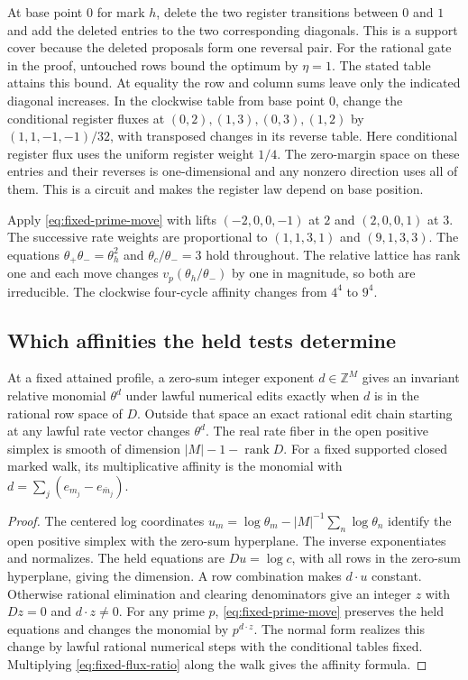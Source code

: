 At base point \(0\) for mark \(h\), delete the two register
transitions between \(0\) and \(1\) and add the deleted entries to
the two corresponding diagonals. This is a support cover because
the deleted proposals form one reversal pair. For the rational
gate in the proof, untouched rows bound the optimum by \(\eta=1\).
The stated table attains this bound. At equality the row and
column sums leave only the indicated diagonal increases. In the
clockwise table from base point \(0\), change the conditional register fluxes at
\((0,2),(1,3),(0,3),(1,2)\) by
\((1,1,-1,-1)/32\), with transposed changes in its reverse table.
Here conditional register flux uses the uniform register weight
\(1/4\). The zero-margin space on these entries and their reverses
is one-dimensional and any nonzero direction uses all of them.
This is a circuit and makes the register law depend on base position.

Apply \eqref{eq:fixed-prime-move} with lifts \((-2,0,0,-1)\) at
\(2\) and \((2,0,0,1)\) at \(3\). The successive rate weights are
proportional to \((1,1,3,1)\) and \((9,1,3,3)\). The equations
\(\theta_+\theta_-=\theta_h^2\) and \(\theta_c/\theta_-=3\) hold
throughout. The relative lattice has rank one and each move
changes \(v_p(\theta_h/\theta_-)\) by one in magnitude, so both are
irreducible. The clockwise four-cycle affinity changes from \(4^4\)
to \(9^4\).

\subsection{Which affinities the held tests determine}

\begin{theorem}\label{thm:fixed-affinity}
At a fixed attained profile, a zero-sum integer exponent
\(d\in\mathbb Z^M\) gives an invariant relative monomial
\(\theta^d\) under lawful numerical edits exactly when \(d\) is in
the rational row space of \(D\). Outside that space an exact rational
edit chain starting at any lawful rate vector changes \(\theta^d\).
The real rate fiber in the open positive simplex is smooth of
dimension \(|M|-1-\operatorname{rank}D\). For a fixed supported
closed marked walk, its multiplicative affinity is the monomial
with \(d=\sum_j(e_{m_j}-e_{\bar m_j})\).
\end{theorem}

\begin{proof}
The centered log coordinates
\(u_m=\log\theta_m-|M|^{-1}\sum_n\log\theta_n\)
identify the open positive simplex with the zero-sum hyperplane.
The inverse exponentiates and normalizes. The held equations are
\(Du=\log c\), with all rows in the zero-sum hyperplane, giving the
dimension. A row combination makes \(d\cdot u\) constant. Otherwise
rational elimination and clearing denominators give an integer
\(z\) with \(Dz=0\) and \(d\cdot z\ne0\). For any prime \(p\),
\eqref{eq:fixed-prime-move} preserves the held equations and changes
the monomial by \(p^{d\cdot z}\). The normal form realizes this
change by lawful rational numerical steps with the conditional
tables fixed. Multiplying \eqref{eq:fixed-flux-ratio} along the walk
gives the affinity formula.
\end{proof}

